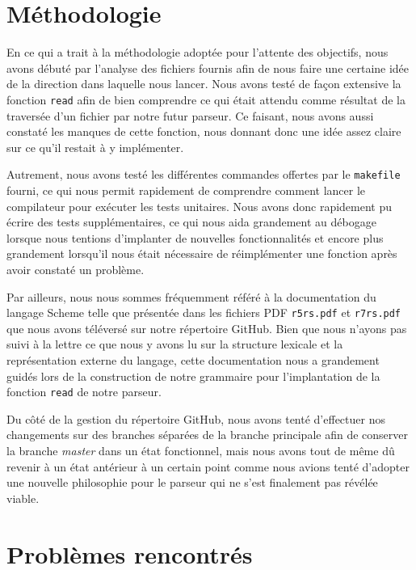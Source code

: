\documentclass[12pt]{article}
\begin{document}
\section{Méthodologie}
En ce qui a trait à la méthodologie adoptée pour l'attente des objectifs, nous avons débuté par l'analyse des fichiers fournis afin de nous faire une certaine idée de la direction dans laquelle nous lancer. Nous avons testé de façon extensive la fonction \texttt{read} afin de bien comprendre ce qui était attendu comme résultat de la traversée d'un fichier par notre futur parseur. Ce faisant, nous avons aussi constaté les manques de cette fonction, nous donnant donc une idée assez claire sur ce qu'il restait à y implémenter.

Autrement, nous avons testé les différentes commandes offertes par le \texttt{makefile} fourni, ce qui nous permit rapidement de comprendre comment lancer le compilateur pour exécuter les tests unitaires. Nous avons donc rapidement pu écrire des tests supplémentaires, ce qui nous aida grandement au débogage lorsque nous tentions d'implanter de nouvelles fonctionnalités et encore plus grandement lorsqu'il nous était nécessaire de réimplémenter une fonction après avoir constaté un problème.

Par ailleurs, nous nous sommes fréquemment référé à la documentation du langage Scheme telle que présentée dans les fichiers PDF \texttt{r5rs.pdf} et \texttt{r7rs.pdf} que nous avons téléversé sur notre répertoire GitHub. Bien que nous n'ayons pas suivi à la lettre ce que nous y avons lu sur la structure lexicale et la représentation externe du langage, cette documentation nous a grandement guidés lors de la construction de notre grammaire pour l'implantation de la fonction \texttt{read} de notre parseur.

Du côté de la gestion du répertoire GitHub, nous avons tenté d'effectuer nos changements sur des branches séparées de la branche principale afin de conserver la branche \textit{master} dans un état fonctionnel, mais nous avons tout de même dû revenir à un état antérieur à un certain point comme nous avions tenté d'adopter une nouvelle philosophie pour le parseur qui ne s'est finalement pas révélée viable.

\section{Problèmes rencontrés}
\end{document}
